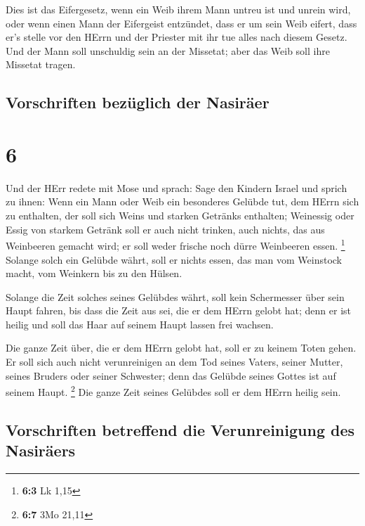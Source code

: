  Dies ist das Eifergesetz, wenn ein Weib ihrem Mann
untreu ist und unrein wird,  oder wenn einen Mann der
Eifergeist entzündet, dass er um sein Weib eifert, dass er's stelle vor
den HErrn und der Priester mit ihr tue alles nach diesem Gesetz.
 Und der Mann soll unschuldig sein an der Missetat; aber
das Weib soll ihre Missetat tragen.

\hypertarget{vorschriften-bezuxfcglich-der-nasiruxe4er}{%
\subsection{Vorschriften bezüglich der
Nasiräer}\label{vorschriften-bezuxfcglich-der-nasiruxe4er}}

\hypertarget{section-5}{%
\section{6}\label{section-5}}

 Und der HErr redete mit Mose und sprach: 
Sage den Kindern Israel und sprich zu ihnen: Wenn ein Mann oder Weib ein
besonderes Gelübde tut, dem HErrn sich zu enthalten,  der
soll sich Weins und starken Getränks enthalten; Weinessig oder Essig von
starkem Getränk soll er auch nicht trinken, auch nichts, das aus
Weinbeeren gemacht wird; er soll weder frische noch dürre Weinbeeren
essen. \footnote{\textbf{6:3} Lk 1,15}  Solange solch ein
Gelübde währt, soll er nichts essen, das man vom Weinstock macht, vom
Weinkern bis zu den Hülsen.

 Solange die Zeit solches seines Gelübdes währt, soll kein
Schermesser über sein Haupt fahren, bis dass die Zeit aus sei, die er
dem HErrn gelobt hat; denn er ist heilig und soll das Haar auf seinem
Haupt lassen frei wachsen.

 Die ganze Zeit über, die er dem HErrn gelobt hat, soll er
zu keinem Toten gehen.  Er soll sich auch nicht
verunreinigen an dem Tod seines Vaters, seiner Mutter, seines Bruders
oder seiner Schwester; denn das Gelübde seines Gottes ist auf seinem
Haupt. \footnote{\textbf{6:7} 3Mo 21,11}  Die ganze Zeit
seines Gelübdes soll er dem HErrn heilig sein.

\hypertarget{vorschriften-betreffend-die-verunreinigung-des-nasiruxe4ers}{%
\subsection{Vorschriften betreffend die Verunreinigung des
Nasiräers}\label{vorschriften-betreffend-die-verunreinigung-des-nasiruxe4ers}}


